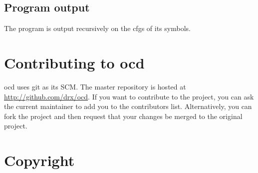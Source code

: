 \documentclass[leqno,11pt]{article}
\begin{document}
\subsection{Program output}

The program is output recursively on the cfgs of its symbols.

\section{Contributing to ocd}

ocd uses git as its SCM. The master repository is hosted at \url{http://github.com/drx/ocd}. If you want to contribute to the project, you can ask the current maintainer to add you to the contributors list. Alternatively, you can fork the project and then request that your changes be merged to the original project.

\section{Copyright}


\end{document}
